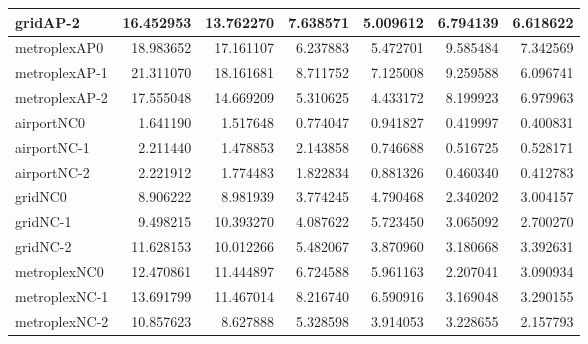 \begin{longtable}{|l|r|r|r|r|r|r|}
gridAP-2 & 16.452953 & 13.762270 & 7.638571 & 5.009612 & 6.794139 & 6.618622 \\ \hline
metroplexAP0 & 18.983652 & 17.161107 & 6.237883 & 5.472701 & 9.585484 & 7.342569 \\ \hline
metroplexAP-1 & 21.311070 & 18.161681 & 8.711752 & 7.125008 & 9.259588 & 6.096741 \\ \hline
metroplexAP-2 & 17.555048 & 14.669209 & 5.310625 & 4.433172 & 8.199923 & 6.979963 \\ \hline
airportNC0 & 1.641190 & 1.517648 & 0.774047 & 0.941827 & 0.419997 & 0.400831 \\ \hline
airportNC-1 & 2.211440 & 1.478853 & 2.143858 & 0.746688 & 0.516725 & 0.528171 \\ \hline
airportNC-2 & 2.221912 & 1.774483 & 1.822834 & 0.881326 & 0.460340 & 0.412783 \\ \hline
gridNC0 & 8.906222 & 8.981939 & 3.774245 & 4.790468 & 2.340202 & 3.004157 \\ \hline
gridNC-1 & 9.498215 & 10.393270 & 4.087622 & 5.723450 & 3.065092 & 2.700270 \\ \hline
gridNC-2 & 11.628153 & 10.012266 & 5.482067 & 3.870960 & 3.180668 & 3.392631 \\ \hline
metroplexNC0 & 12.470861 & 11.444897 & 6.724588 & 5.961163 & 2.207041 & 3.090934 \\ \hline
metroplexNC-1 & 13.691799 & 11.467014 & 8.216740 & 6.590916 & 3.169048 & 3.290155 \\ \hline
metroplexNC-2 & 10.857623 & 8.627888 & 5.328598 & 3.914053 & 3.228655 & 2.157793 \\ \hline
\end{longtable}
